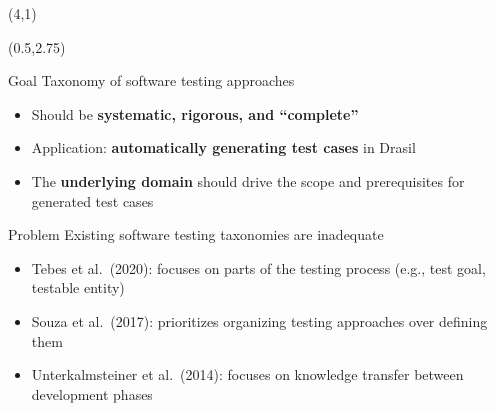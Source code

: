 \documentclass[22pt]{beamer}
\begin{document}
\begin{frame}[fragile]
    \begin{textblock}{8}(4,1)
        \titlepage
    \end{textblock}

    \begin{textblock}{7.25}(0.5,2.75)
        \begin{block}{\fontsize{37}{20}\selectfont Goal}
            Taxonomy of software testing approaches
            \begin{itemize}
                \item Should be \textbf{systematic, rigorous, and ``complete''}
                \item Application: \textbf{automatically generating test cases}
                      in Drasil %
                \item The \textbf{underlying domain} should drive the scope and
                      prerequisites for generated test cases
            \end{itemize}

            \vspace{5mm}
        \end{block}

        \begin{block}{\fontsize{37}{20}\selectfont Problem}
            Existing software testing taxonomies are inadequate
            \begin{itemize}
                \item Tebes et al.~(2020): focuses on parts of the
                      testing process (e.g., test goal, testable entity)
                \item Souza et al.~(2017): prioritizes organizing testing
                      approaches over defining them
                \item Unterkalmsteiner et al.~(2014): focuses on knowledge
                      transfer between development phases
            \end{itemize}
            \vspace{5mm}
        \end{block}


\end{textblock}
\end{frame}
\end{document}
